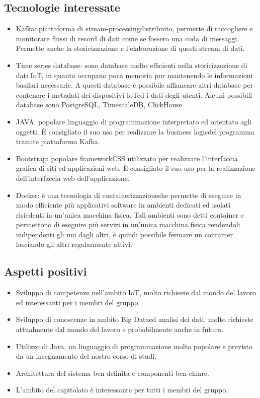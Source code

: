 \subsection{Tecnologie interessate}
\begin{itemize}
	\item Kafka\glosp: piattaforma di stream-processing\glosp distribuito, permette di raccogliere e monitorare flussi di record di dati come se fossero una coda di messaggi. Permette anche la storicizzazione e l'elaborazione di questi stream di dati.	
	\item Time series database\glosp: sono database molto efficienti nella storicizzazione di dati IoT\glo, in quanto occupano poca memoria pur mantenendo le informazioni basilari necessarie. A questi database è possibile affiancare altri database per contenere i metadati dei dispositivi IoT\glosp ed i dati degli utenti. Alcuni possibili database sono PostgreSQL\glo, TimescaleDB\glo, ClickHouse\glo.
	\item JAVA\glosp: popolare linguaggio di programmazione interpretato ed orientato agli oggetti. È consigliato il suo uso per realizzare la business logic\glosp del programma tramite piattaforma Kafka\glo.
	\item Bootstrap\glosp: popolare framework\glosp CSS utilizzato per realizzare l'interfaccia grafica di siti ed applicazioni web. È consigliato il suo uso per la realizzazione dell'interfaccia web dell'applicazione.
	\item Docker\glosp: è una tecnologia di containerizzazione\glosp che permette di eseguire in modo efficiente più applicativi software in ambienti dedicati ed isolati risiedenti in un'unica macchina fisica. Tali ambienti sono detti container e permettono di eseguire più servizi in un'unica macchina fisica rendendoli indipendenti gli uni dagli altri, è quindi possibile fermare un container lasciando gli altri regolarmente attivi.
\end{itemize} 
\subsection{Aspetti positivi}
\begin{itemize} 
	\item Sviluppo di competenze nell'ambito IoT\glo, molto richieste dal mondo del lavoro ed interessanti per i membri del gruppo.
	\item Sviluppo di conoscenze in ambito Big Data\glosp ed analisi dei dati, molto richieste attualmente dal mondo del lavoro e probabilmente anche in futuro.
	\item Utilizzo di Java, un linguaggio di programmazione molto popolare e previsto da un insegnamento del nostro corso di studi.
	\item Architettura del sistema ben definita e componenti ben chiare.
	\item L'ambito del capitolato è interessante per tutti i membri del gruppo.
\end{itemize}
